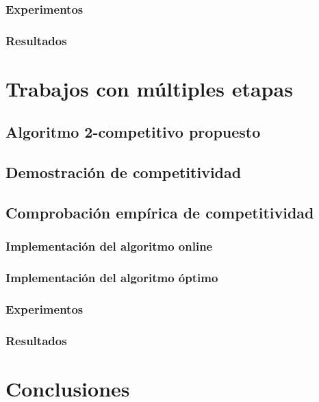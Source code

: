 \documentclass[12pt,letterpaper]{article}
\begin{document}
\subsubsection{Experimentos}
\subsubsection{Resultados}

\section{Trabajos con múltiples etapas}
\subsection{Algoritmo 2-competitivo propuesto}
\subsection{Demostración de competitividad}
\subsection{Comprobación empírica de competitividad}
\subsubsection{Implementación del algoritmo online}
\subsubsection{Implementación del algoritmo óptimo}
\subsubsection{Experimentos}
\subsubsection{Resultados}

\section{Conclusiones}

\end{document}

